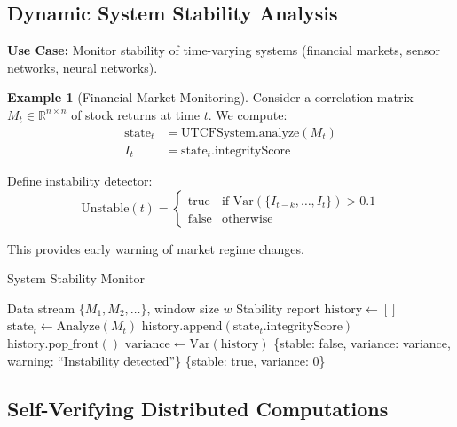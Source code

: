 \documentclass[11pt,a4paper]{article}
\theoremstyle{definition}
\newtheorem{example}[theorem]{Example}
\theoremstyle{remark}
\newcommand{\R}{\mathbb{R}}
\begin{document}
\subsection{Dynamic System Stability Analysis}

\textbf{Use Case:} Monitor stability of time-varying systems (financial markets, sensor networks, neural networks).

\begin{example}[Financial Market Monitoring]
Consider a correlation matrix $M_t \in \R^{n \times n}$ of stock returns at time $t$. We compute:
\begin{align}
\text{state}_t &= \text{UTCFSystem.analyze}(M_t) \\
I_t &= \text{state}_t.\text{integrityScore}
\end{align}

Define instability detector:
\begin{equation}
\text{Unstable}(t) = \begin{cases}
\text{true} & \text{if } \text{Var}(\{I_{t-k}, \ldots, I_t\}) > 0.1 \\
\text{false} & \text{otherwise}
\end{cases}
\end{equation}

This provides early warning of market regime changes.
\end{example}

\begin{algorithm}
\caption{System Stability Monitor}\label{alg:stability}
\begin{algorithmic}[1]
\Require Data stream $\{M_1, M_2, \ldots\}$, window size $w$
\Ensure Stability report
\State $\text{history} \gets []$
  \State $\text{state}_t \gets \text{Analyze}(M_t)$
  \State $\text{history.append}(\text{state}_t.\text{integrityScore})$
    \State $\text{history.pop\_front}()$
  \EndIf
  \State $\text{variance} \gets \text{Var}(\text{history})$
    \State \Return \{stable: false, variance: variance, warning: ``Instability detected''\}
  \EndIf
\EndFor
\State \Return \{stable: true, variance: 0\}
\end{algorithmic}
\end{algorithm}

\subsection{Self-Verifying Distributed Computations}
\end{document}
